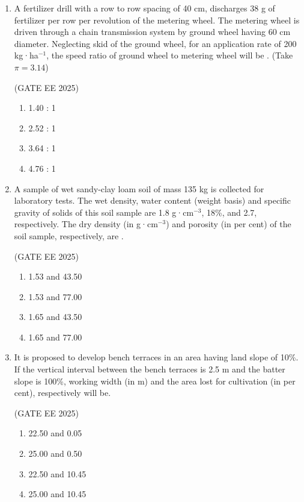 \documentclass[journal,12pt,onecolumn]{IEEEtran}
\theoremstyle{remark}
\begin{document}
\begin{enumerate}
\item A fertilizer drill with a row to row spacing of 40 cm, discharges 38 g of fertilizer per row per revolution of the metering wheel. The metering wheel is driven through a chain transmission system by ground wheel having 60 cm diameter. Neglecting skid of the ground wheel, for an application rate of 200 kg·ha$^{-1}$, the speed ratio of ground wheel to metering wheel will be . (Take $\pi = 3.14$)

\hfill(GATE EE 2025)

\begin{multicols}{4}
\begin{enumerate}
\item 1.40 : 1
\item 2.52 : 1
\item 3.64 : 1
\item 4.76 : 1
\end{enumerate}
\end{multicols}

\item A sample of wet sandy-clay loam soil of mass 135 kg is collected for laboratory tests. The wet density, water content (weight basis) and specific gravity of solids of this soil sample are 1.8 g·cm$^{-3}$, 18\%, and 2.7, respectively. The dry density (in g·cm$^{-3}$) and porosity (in per cent) of the soil sample, respectively, are .

\hfill(GATE EE 2025)

\begin{multicols}{4}
\begin{enumerate}
\item 1.53 and 43.50
\item 1.53 and 77.00
\item 1.65 and 43.50
\item 1.65 and 77.00
\end{enumerate}
\end{multicols}

\item It is proposed to develop bench terraces in an area having land slope of 10\%. If the vertical interval between the bench terraces is 2.5 m and the batter slope is 100\%, working width (in m) and the area lost for cultivation (in per cent), respectively will be.

\hfill(GATE EE 2025)

\begin{multicols}{4}
\begin{enumerate}
\item 22.50 and 0.05
\item 25.00 and 0.50
\item 22.50 and 10.45
\item 25.00 and 10.45
\end{enumerate}
\end{multicols}


\end{enumerate}
\end{document}
